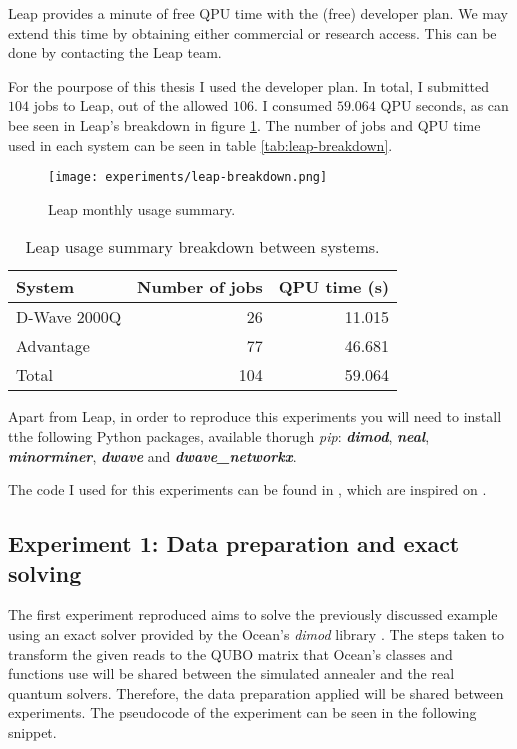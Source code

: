 Leap provides a minute of free QPU time with the (free) developer plan. We may extend this time by obtaining either commercial or research access. This can be done by contacting the Leap team.

For the pourpose of this thesis I used the developer plan. In total, I submitted $104$ jobs to Leap, out of the allowed $106$. I consumed $59.064$ QPU seconds, as can bee seen in Leap's breakdown in figure \ref{fig:leap-breakdown}. The number of jobs and QPU time used in each system can be seen in table \ref{tab:leap-breakdown}.

\begin{figure}[H]
	\texttt{[image: experiments/leap-breakdown.png]}
	\centering
	\caption{Leap monthly usage summary.}
	\label{fig:leap-breakdown}
\end{figure}

\begin{table}[H]
	\centering
	\begin{tabular}{lrr}
		\textbf{System} & \textbf{Number of jobs} & \textbf{QPU time (s)} \\
		\hline
		D-Wave 2000Q	& 26	& 11.015	\\
		Advantage		& 77	& 46.681	\\
		Total			& 104	& 59.064                     
	\end{tabular}
	\caption{Leap usage summary breakdown between systems.}
	\label{tableap-breakdown}
\end{table}


Apart from Leap, in order to reproduce this experiments you will need to install tthe following Python packages, available thorugh \emph{pip}: \textbf{\emph{dimod}}, \textbf{\emph{neal}}, \textbf{\emph{minorminer}}, \textbf{\emph{dwave}} and \textbf{\emph{dwave\_networkx}}.

The code I used for this experiments can be found in \cite{thesis-code}, which are inspired on \cite{Sarkar2020}.


\subsection{Experiment 1: Data preparation and exact solving}


The first experiment reproduced aims to solve the previously discussed example using an exact solver provided by the Ocean's \emph{dimod} library \cite{Dimod}. The steps taken to transform the given reads to the QUBO matrix that Ocean's classes and functions use will be shared between the simulated annealer and the real quantum solvers. Therefore, the data preparation applied will be shared between experiments. The pseudocode of the experiment can be seen in the following snippet.

